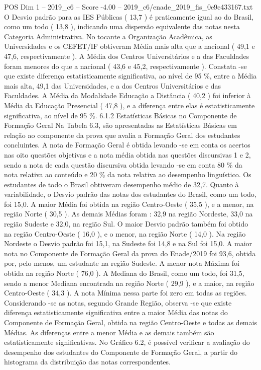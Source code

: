 \begin{textsample}{POS Dim 1 – 2019\_c6 – Score -4.00 – 2019\_c6/enade\_2019\_fis\_0e9c433167.txt}
O Desvio padrão para as IES Públicas ( 13,7 ) é praticamente igual ao do Brasil, como um todo ( 13,8 ), indicando uma dispersão equivalente das notas nesta Categoria Administrativa.
No tocante a Organização Acadêmica, as Universidades e os CEFET/IF obtiveram Média mais alta que a nacional ( 49,1 e 47,6, respectivamente ).
A Média dos Centros Universitários e a das Faculdades foram menores do que a nacional ( 43,6 e 45,2, respectivamente ).
Constata -se que existe diferença estatisticamente significativa, ao nível de 95 \%, entre a Média mais alta, 49,1 das Universidades, e a dos Centros Universitários e das Faculdades.
A Média da Modalidade Educação a Distância ( 40,2 ) foi inferior à Média da Educação Presencial ( 47,8 ), e a diferença entre elas é estatisticamente significativa, ao nível de 95 \%. 6.1.2 Estatísticas Básicas no Componente de Formação Geral Na Tabela 6.3, são apresentadas as Estatísticas Básicas em relação ao componente da prova que avalia a Formação Geral dos estudantes concluintes.
A nota de Formação Geral é obtida levando -se em conta os acertos nas oito questões objetivas e a nota média obtida nas questões discursivas 1 e 2, sendo a nota de cada questão discursiva obtida levando -se em conta 80 \% da nota relativa ao conteúdo e 20 \% da nota relativa ao desempenho linguístico.
Os estudantes de todo o Brasil obtiveram desempenho médio de 32,7.
Quanto à variabilidade, o Desvio padrão das notas dos estudantes do Brasil, como um todo, foi 15,0.
A maior Média foi obtida na região Centro-Oeste ( 35,5 ), e a menor, na região Norte ( 30,5 ).
As demais Médias foram : 32,9 na região Nordeste, 33,0 na região Sudeste e 32,0, na região Sul.
O maior Desvio padrão também foi obtido na região Centro-Oeste ( 16,0 ), e o menor, na região Norte ( 14,0 ).
Na região Nordeste o Desvio padrão foi 15,1, na Sudeste foi 14,8 e na Sul foi 15,0.
A maior nota no Componente de Formação Geral da prova do Enade/2019 foi 93,6, obtida por, pelo menos, um estudante na região Sudeste.
A menor nota Máxima foi obtida na região Norte ( 76,0 ).
A Mediana do Brasil, como um todo, foi 31,5, sendo a menor Mediana encontrada na região Norte ( 29,9 ), e a maior, na região Centro-Oeste ( 34,3 ).
A nota Mínima nessa parte foi zero em todas as regiões.
Considerando -se as notas, segundo Grande Região, observa -se que existe diferença estatisticamente significativa entre a maior Média das notas do Componente de Formação Geral, obtida na região Centro-Oeste e todas as demais Médias.
As diferenças entre a menor Média e as demais também são estatisticamente significativas.
No Gráfico 6.2, é possível verificar a avaliação do desempenho dos estudantes do Componente de Formação Geral, a partir do histograma da distribuição das notas correspondentes.

\end{textsample}
